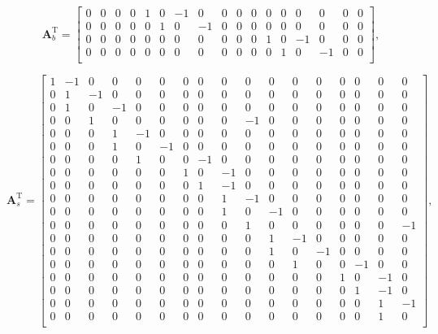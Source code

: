 \documentclass{article}
\def\T{\mathrm{T}}
\begin{document}
\begin{equation}
    \bm{A}_b^\T = 
    \begin{bmatrix}
        0 & 0 & 0 & 0 & 1 & 0 &-1 & 0 & 0 & 0 & 0 & 0 & 0 & 0 & 0 & 0 & 0 \\
        0 & 0 & 0 & 0 & 0 & 1 & 0 &-1 & 0 & 0 & 0 & 0 & 0 & 0 & 0 & 0 & 0 \\
        0 & 0 & 0 & 0 & 0 & 0 & 0 & 0 & 0 & 0 & 0 & 1 & 0 &-1 & 0 & 0 & 0 \\
        0 & 0 & 0 & 0 & 0 & 0 & 0 & 0 & 0 & 0 & 0 & 0 & 1 & 0 &-1 & 0 & 0 \\
    \end{bmatrix},
\end{equation}

\begin{equation}
    \bm{A}_s^\T = 
    \begin{bmatrix}
        1 &-1 & 0 & 0 & 0 & 0 & 0 & 0 & 0 & 0 & 0 & 0 & 0 & 0 & 0 & 0 & 0 \\
        0 & 1 &-1 & 0 & 0 & 0 & 0 & 0 & 0 & 0 & 0 & 0 & 0 & 0 & 0 & 0 & 0 \\
        0 & 1 & 0 &-1 & 0 & 0 & 0 & 0 & 0 & 0 & 0 & 0 & 0 & 0 & 0 & 0 & 0 \\
        0 & 0 & 1 & 0 & 0 & 0 & 0 & 0 & 0 &-1 & 0 & 0 & 0 & 0 & 0 & 0 & 0 \\
        0 & 0 & 0 & 1 &-1 & 0 & 0 & 0 & 0 & 0 & 0 & 0 & 0 & 0 & 0 & 0 & 0 \\
        0 & 0 & 0 & 1 & 0 &-1 & 0 & 0 & 0 & 0 & 0 & 0 & 0 & 0 & 0 & 0 & 0 \\
        0 & 0 & 0 & 0 & 1 & 0 & 0 &-1 & 0 & 0 & 0 & 0 & 0 & 0 & 0 & 0 & 0 \\
        0 & 0 & 0 & 0 & 0 & 0 & 1 & 0 &-1 & 0 & 0 & 0 & 0 & 0 & 0 & 0 & 0 \\
        0 & 0 & 0 & 0 & 0 & 0 & 0 & 1 &-1 & 0 & 0 & 0 & 0 & 0 & 0 & 0 & 0 \\
        0 & 0 & 0 & 0 & 0 & 0 & 0 & 0 & 1 &-1 & 0 & 0 & 0 & 0 & 0 & 0 & 0 \\
        0 & 0 & 0 & 0 & 0 & 0 & 0 & 0 & 1 & 0 &-1 & 0 & 0 & 0 & 0 & 0 & 0 \\
        0 & 0 & 0 & 0 & 0 & 0 & 0 & 0 & 0 & 1 & 0 & 0 & 0 & 0 & 0 & 0 &-1 \\
        0 & 0 & 0 & 0 & 0 & 0 & 0 & 0 & 0 & 0 & 1 &-1 & 0 & 0 & 0 & 0 & 0 \\
        0 & 0 & 0 & 0 & 0 & 0 & 0 & 0 & 0 & 0 & 1 & 0 &-1 & 0 & 0 & 0 & 0 \\
        0 & 0 & 0 & 0 & 0 & 0 & 0 & 0 & 0 & 0 & 0 & 1 & 0 & 0 &-1 & 0 & 0 \\
        0 & 0 & 0 & 0 & 0 & 0 & 0 & 0 & 0 & 0 & 0 & 0 & 0 & 1 & 0 &-1 & 0 \\
        0 & 0 & 0 & 0 & 0 & 0 & 0 & 0 & 0 & 0 & 0 & 0 & 0 & 0 & 1 &-1 & 0 \\
        0 & 0 & 0 & 0 & 0 & 0 & 0 & 0 & 0 & 0 & 0 & 0 & 0 & 0 & 0 & 1 &-1 \\
        0 & 0 & 0 & 0 & 0 & 0 & 0 & 0 & 0 & 0 & 0 & 0 & 0 & 0 & 0 & 1 & 0 \\
    \end{bmatrix},
\end{equation}
\end{document}
